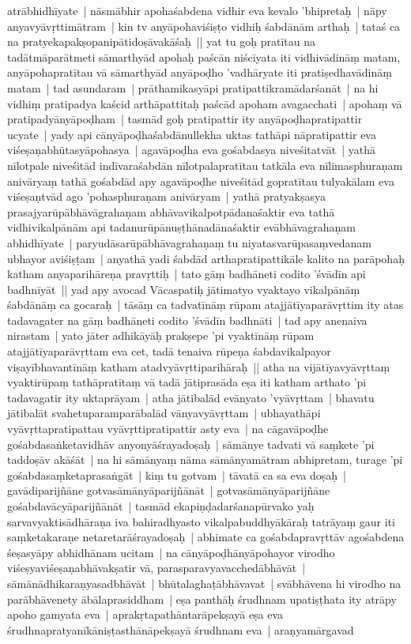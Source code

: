 \documentclass[article,12pt,a4paper]{memoir}%
\newcounter{parCount}
\begin{document}
	  \pstart \leavevmode%
	\label{thakur75-59.4}atrābhidhīyate | nāsmābhir apohaśabdena vidhir eva kevalo 'bhipretaḥ | nāpy anyavyāvṛttimātram | kin tv anyāpohaviśiṣṭo vidhiḥ śabdānām arthaḥ | tataś ca na pratyekapakṣopanipātidoṣāvakāśaḥ || \label{thakur75-59.7} yat tu goḥ pratītau na tadātmāparātmeti sāmarthyād apohaḥ paścān niścīyata iti vidhivādināṃ matam, anyāpohapratītau vā sāmarthyād anyāpoḍho 'vadhāryate iti pratiṣedhavādināṃ matam | tad asundaram | prāthamikasyāpi pratipattikramādarśanāt | na hi vidhiṃ pratipadya kaścid arthāpattitaḥ paścād apoham avagacchati | apohaṃ vā pratipadyānyāpoḍham | tasmād goḥ pratipattir ity anyāpoḍhapratipattir ucyate | yady api cānyāpoḍhaśabdānullekha uktas tathāpi nāpratipattir eva viśeṣaṇabhūtasyāpohasya | agavāpoḍha eva gośabdasya niveśitatvāt | yathā nīlotpale niveśitād indīvaraśabdān nīlotpalapratītau tatkāla eva nīlimasphuraṇam anivāryaṃ tathā gośabdād apy agavāpoḍhe niveśitād gopratītau tulyakālam eva viśeṣaṇtvād ago 'pohasphuraṇam anivāryam | yathā pratyakṣasya prasajyarūpābhāvāgrahaṇam abhāvavikalpotpādanaśaktir eva tathā vidhivikalpānām api tadanurūpānuṣṭhānadānaśaktir evābhāvagrahaṇam abhidhīyate | paryudāsarūpābhāvagrahaṇaṃ tu niyatasvarūpasaṃvedanam ubhayor aviśiṣṭam | anyathā yadi śabdād arthapratipattikāle kalito na parāpohaḥ katham anyaparihāreṇa pravṛttiḥ | tato gāṃ badhāneti codito 'śvādīn api badhnīyāt || \label{thakur75-59.21} yad apy avocad Vācaspatiḥ jātimatyo vyaktayo vikalpānāṃ śabdānāṃ ca gocaraḥ | tāsāṃ ca tadvatīnāṃ rūpam atajjātīyaparāvṛttim ity atas tadavagater na gāṃ badhāneti codito 'śvādīn badhnāti | tad apy anenaiva nirastam | yato jāter adhikāyāḥ prakṣepe 'pi vyaktīnāṃ rūpam atajjātīyaparāvṛttam eva cet, tadā tenaiva rūpeṇa śabdavikalpayor viṣayībhavantīnāṃ katham atadvyāvṛttiparihāraḥ || \label{thakur75-59.26} atha na vijātīyavyāvṛttaṃ vyaktirūpaṃ tathāpratītaṃ vā tadā jātiprasāda eṣa iti katham arthato 'pi tadavagatir ity uktaprāyam | \label{thakur75-59.28} atha jātibalād evānyato 'vyāvṛttam | bhavatu jātibalāt svahetuparamparābalād vānyavyāvṛttam | ubhayathāpi vyāvṛttapratipattau vyāvṛttipratipattir asty eva | \label{thakur75-60.1} na cāgavāpoḍhe gośabdasaṅketavidhāv anyonyāśrayadoṣaḥ | sāmānye tadvati vā saṃkete 'pi taddoṣāv akāśāt | na hi sāmānyaṃ nāma sāmānyamātram abhipretam, turage 'pi gośabdasaṃketaprasaṅgāt | kiṃ tu gotvam | tāvatā ca sa eva doṣaḥ | gavādiparijñāne gotvasāmānyāparijñānāt | gotvasāmānyāparijñāne gośabdavācyāparijñānāt | \label{thakur75-60.6} tasmād ekapiṇḍadarśanapūrvako yaḥ sarvavyaktisādhāraṇa iva bahiradhyasto vikalpabuddhyākāraḥ tatrāyaṃ gaur iti saṃketakaraṇe netaretarāśrayadoṣaḥ | \label{thakur75-60.8} abhimate ca gośabdapravṛttāv agośabdena śeṣasyāpy abhidhānam ucitam | na cānyāpoḍhānyāpohayor virodho viśeṣyaviśeṣaṇabhāvakṣatir vā, parasparavyavacchedābhāvāt | sāmānādhikaraṇyasadbhāvāt | bhūtalaghaṭābhāvavat | svābhāvena hi virodho na parābhāvenety ābālaprasiddham | eṣa panthāḥ śrudhnam upatiṣṭhata ity atrāpy apoho gamyata eva | aprakṛtapathāntarāpekṣayā eṣa eva śrudhnapratyanīkāniṣṭasthānāpekṣayā śrudhnam eva | araṇyamārgavad 
\end{document}
